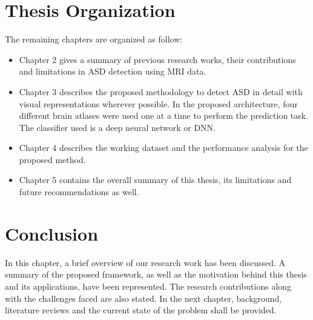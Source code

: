 \section{Thesis Organization}
The remaining chapters are organized as follow:\\
\begin{itemize}
\item Chapter 2 gives a summary of previous research works, their contributions and
limitations in ASD detection using MRI data.
\item Chapter 3 describes the proposed methodology to detect ASD in detail with visual
representations wherever possible. In the proposed architecture, four different brain
atlases were used one at a time to perform the prediction task. The classifier used is
a deep neural network or \Gls{DNN}.
\item Chapter 4 describes the working dataset and the performance analysis for the
proposed method.
\item Chapter 5 contains the overall summary of this thesis, its limitations and future
recommendations as well.
\end{itemize}

\section{Conclusion}
In this chapter, a brief overview of our research work has been discussed. A summary of the
proposed framework, as well as the motivation behind this thesis and its applications, have
been represented. The research contributions along with the challenges faced are also
stated. In the next chapter, background, literature reviews and the current state of the problem
shall be provided.